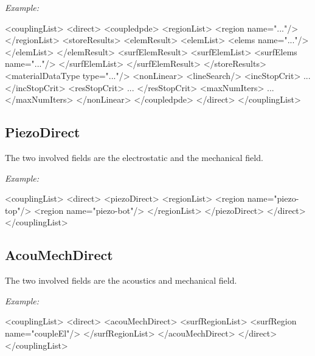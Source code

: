 \bigskip
\noindent
{\it Example:}

\begin{xmllisting}
<couplingList>
  <direct>
    <coupledpde>
      <regionList>
        <region name="..."/>
      </regionList>
      <storeResults>
        <elemResult>
          <elemList>
            <elems name="..."/>
          </elemList>
        </elemResult>
        <surfElemResult>
          <surfElemList>
            <surfElems name="..."/>
          </surfElemList>
        </surfElemResult>
      </storeResults>
      <materialDataType type="..."/>
      <nonLinear>
        <lineSearch/>
        <incStopCrit> ... </incStopCrit>
        <resStopCrit> ... </resStopCrit>
        <maxNumIters> ... </maxNumIters>
      </nonLinear>
    </coupledpde>
  </direct>
</couplingList>
\end{xmllisting}

\subsection{PiezoDirect}
The two involved fields are the electrostatic and the mechanical field.

\bigskip
\noindent
{\it Example:}

\begin{xmllisting}
<couplingList>     
   <direct>
      <piezoDirect>
        <regionList>
          <region name="piezo-top"/>
          <region name="piezo-bot"/>
        </regionList>
     </piezoDirect>
   </direct>
</couplingList>
\end{xmllisting}

\subsection{AcouMechDirect}
The two involved fields are the acoustics and mechanical field.

\bigskip
\noindent
{\it Example:}

\begin{xmllisting}
    <couplingList>
      <direct>
        <acouMechDirect>
          <surfRegionList>
            <surfRegion name="coupleEl"/>
          </surfRegionList>
        </acouMechDirect>
      </direct>
    </couplingList>
\end{xmllisting}


